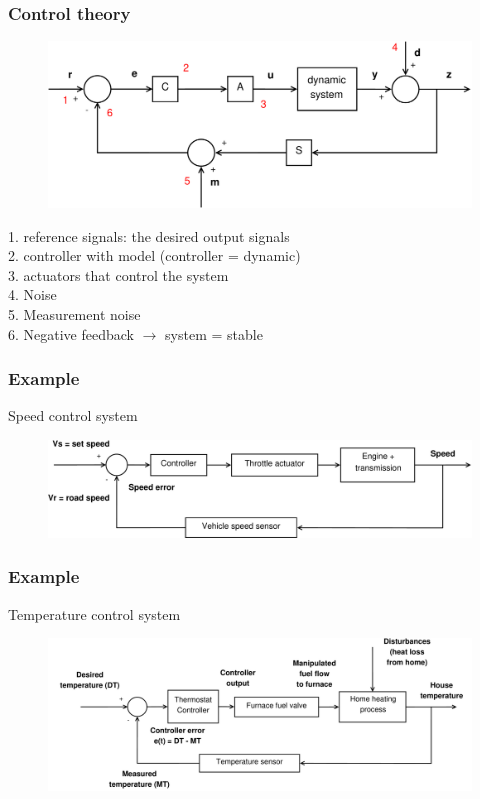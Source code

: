 \documentclass{beamer}
\begin{document}

\begin{frame}
\vspace{-4ex}
\frametitle{Control theory}
\begin{figure}
\includegraphics[width=1\linewidth]{full_system2}
\end{figure}
\vspace{-4ex}
1. reference signals: the desired output signals\\
2. controller with model (controller = dynamic)\\
3. actuators that control the system\\
4. Noise\\
5. Measurement noise\\
6. Negative feedback $\rightarrow$ system = stable 
\end{frame}


\begin{frame}
\frametitle{Example}
\vspace{-6ex}
Speed control system\\
\begin{figure}
\includegraphics[width=1.1\linewidth]{speed_control_system}
\end{figure}
\end{frame}


\begin{frame}
\frametitle{Example}
Temperature control system\\
\begin{figure}
\includegraphics[width=1\linewidth]{temp_control_system}
\end{figure}
\end{frame}
\end{document}
